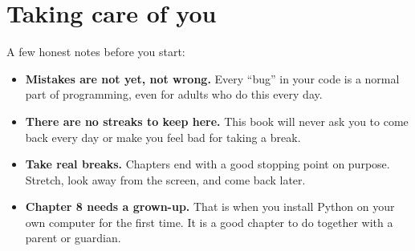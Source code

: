\section{Taking care of you}

A few honest notes before you start:

\begin{itemize}
  \item \textbf{Mistakes are not yet, not wrong.} Every ``bug'' in your code
    is a normal part of programming, even for adults who do this every day.
  \item \textbf{There are no streaks to keep here.} This book will never
    ask you to come back every day or make you feel bad for taking a break.
  \item \textbf{Take real breaks.} Chapters end with a good stopping point
    on purpose. Stretch, look away from the screen, and come back later.
  \item \textbf{Chapter 8 needs a grown-up.} That is when you install
    Python on your own computer for the first time. It is a good chapter to
    do together with a parent or guardian.
\end{itemize}
